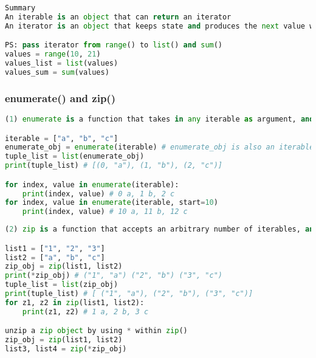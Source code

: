 \documentclass[12pt]{article}
\begin{document}
\begin{lstlisting}[language=Python]
Summary
An iterable is an object that can return an iterator 
An iterator is an object that keeps state and produces the next value when you call next() on it

PS: pass iterator from range() to list() and sum()
values = range(10, 21)
values_list = list(values)
values_sum = sum(values)
\end{lstlisting}

\subsubsection{\normalsize enumerate() and zip()}
\begin{lstlisting}[language=Python]
(1) enumerate is a function that takes in any iterable as argument, and returns a special enumerate object, which consists of pairs, containing the element of the original iterable, along with their index within the iterable. 

iterable = ["a", "b", "c"]
enumerate_obj = enumerate(iterable) # enumerate_obj is also an iterable
tuple_list = list(enumerate_obj)
print(tuple_list) # [(0, "a"), (1, "b"), (2, "c")]

for index, value in enumerate(iterable):
    print(index, value) # 0 a, 1 b, 2 c
for index, value in enumerate(iterable, start=10)
    print(index, value) # 10 a, 11 b, 12 c
\end{lstlisting}

\begin{lstlisting}[language=Python]
(2) zip is a function that accepts an arbitrary number of iterables, and returns an iterator of tuples

list1 = ["1", "2", "3"]
list2 = ["a", "b", "c"]
zip_obj = zip(list1, list2)
print(*zip_obj) # ("1", "a") ("2", "b") ("3", "c")
tuple_list = list(zip_obj)
print(tuple_list) # [ ("1", "a"), ("2", "b"), ("3", "c")]
for z1, z2 in zip(list1, list2):
    print(z1, z2) # 1 a, 2 b, 3 c

unzip a zip object by using * within zip()
zip_obj = zip(list1, list2)
list3, list4 = zip(*zip_obj)
\end{lstlisting}

\end{document}
